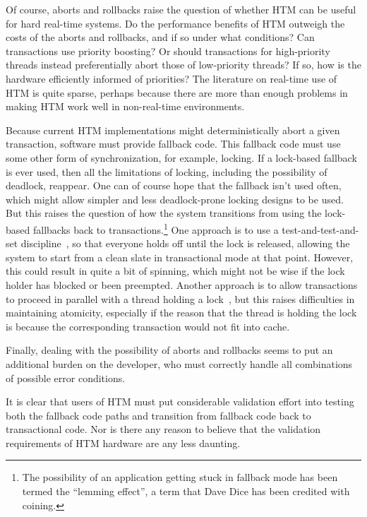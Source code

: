 Of course, aborts and rollbacks raise the question of whether HTM can
be useful for hard real-time systems.
Do the performance benefits of HTM outweigh the costs of the aborts
and rollbacks, and if so under what conditions?
Can transactions use priority boosting?
Or should transactions for high-priority threads instead preferentially
abort those of low-priority threads?
If so, how is the hardware efficiently informed of priorities?
The literature on real-time use of HTM is quite sparse, perhaps
because there are more than enough problems in making HTM work well in
non-real-time environments.

Because current HTM implementations might deterministically abort a
given transaction, software must provide fallback code.
This fallback code must use some other form of synchronization, for
example, locking.
If a lock-based fallback is ever used, then all the limitations of locking,
including the possibility of deadlock, reappear.
One can of course hope that the fallback isn't used often, which might
allow simpler and less deadlock-prone locking designs to be used.
But this raises the question of how the system transitions from using
the lock-based fallbacks back to transactions.\footnote{
	The possibility of an application getting stuck in fallback
	mode has been termed the ``lemming effect'', a term that
	Dave Dice has been credited with coining.}
One approach is to use a test-and-test-and-set discipline~\cite{Martinez02a},
so that everyone holds off until the lock is released, allowing the
system to start from a clean slate in transactional mode at that point.
However, this could result in quite a bit of spinning, which might not
be wise if the lock holder has blocked or been preempted.
Another approach is to allow transactions to proceed in parallel with
a thread holding a lock~\cite{Martinez02a}, but this raises difficulties
in maintaining atomicity, especially if the reason that the thread is
holding the lock is because the corresponding transaction would not fit
into cache.

Finally, dealing with the possibility of aborts and rollbacks seems to
put an additional burden on the developer, who must correctly handle
all combinations of possible error conditions.

It is clear that users of HTM must put considerable validation effort
into testing both the fallback code paths and transition from fallback
code back to transactional code.
Nor is there any reason to believe that the validation requirements of
HTM hardware are any less daunting.

